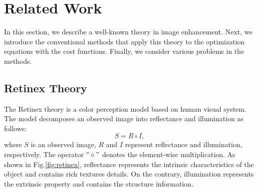 \chapter{Related Work}
\label{sec:related}
In this section, we describe a well-known theory in image enhancement.
Next, we introduce the conventional methods that apply this theory to the optimization equations with the cost functions. Finally, we consider various problems in the methods.
\section{Retinex Theory} \label{sec:retinex}
The Retinex theory \cite{retinex} is a color perception model based on human visual system. The model decomposes an observed image into reflectance and illumination as follows:
\begin{equation}
S = R \circ I, \label{eq:retinex}
\end{equation}
where $S$ is an observed image, $R$ and $I$ represent reflectance and illumination, respectively. The operator $"\circ"$ denotes the element-wise multiplication. As shown in Fig.\ref{fig:retinex}, reflectance represents the intrinsic characteristics of the object and contains rich textures details. On the contrary, illumination represents the extrinsic property and contains the structure information.
